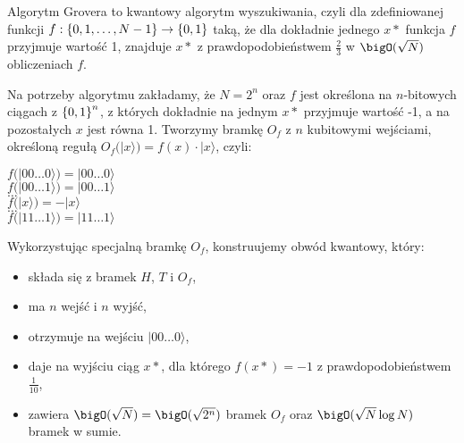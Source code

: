 Algorytm Grovera to kwantowy algorytm wyszukiwania, czyli dla zdefiniowanej funkcji \( f : \set{0, 1, \ldots, N - 1} \rightarrow \set{0, 1} \) taką, że dla dokładnie jednego \( x* \) funkcja \( f \) przyjmuje wartość 1,
znajduje \( x* \) z prawdopodobieństwem \( \frac{2}{3} \) w \( \bigO(\sqrt{N}) \) obliczeniach \( f \).

Na potrzeby algorytmu zakładamy, że \( N = 2^n \) oraz \( f \) jest określona na \( n \)-bitowych ciągach z \( \set{0, 1}^n \), z których dokładnie na jednym \( x* \) przyjmuje wartość -1, a na pozostałych \( x \) jest równa 1.
Tworzymy bramkę \( O_f \) z \( n \) kubitowymi wejściami, określoną regułą \( O_f (|x\rangle) = f(x) \cdot |x \rangle \), czyli:
\begin{center}
    \( f (|00\ldots0 \rangle) = |00\ldots0 \rangle \) \\
    \( f (|00\ldots1 \rangle) = |00\ldots1 \rangle \) \\
    \( \ldots \) \\
    \( f (|x \rangle) = -|x \rangle \) \\
    \( \ldots \) \\
    \( f (|11\ldots1 \rangle) = |11\ldots1 \rangle \)
\end{center}

Wykorzystując specjalną bramkę \( O_f \), konstruujemy obwód kwantowy, który:
\begin{itemize}
    \item składa się z bramek \( H \), \( T \) i \( O_f \),
    \item ma \( n \) wejść i \( n \) wyjść,
    \item otrzymuje na wejściu \( |00\ldots0 \rangle \),
    \item daje na wyjściu ciąg \( x* \), dla którego \( f(x*) = -1 \) z prawdopodobieństwem \( \frac{1}{10} \),
    \item zawiera \( \bigO(\sqrt{N}) = \bigO(\sqrt{2^n}) \) bramek \( O_f \) oraz \( \bigO(\sqrt{N} \log N) \) bramek w sumie.
\end{itemize}

